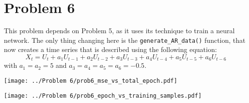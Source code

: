 \section{Problem 6}

This problem depends on Problem 5, as it uses its technique to train a neural network.
The only thing changing here is the \verb|generate_AR_data()| function, that now creates a time series that is described using the following equation:
\[
X_t = U_t + a_1 U_{t-1} + a_2 U_{t-2} + a_3 U_{t-3} + a_4 U_{t-4} + a_5 U_{t-5} + a_6 U_{t-6}
\]
with $a_1 = a_2 = 5$ and $a_3 = a_4 = a_5 = a_6 = -0.5$.

\begin{minipage}{0.48\linewidth}
	\centering
	\texttt{[image: ../Problem 6/prob6\_mse\_vs\_total\_epoch.pdf]}
	\label{fig:prob6_mse_total_epoch}
\end{minipage} \hfill
\begin{minipage}{0.48\linewidth}
	\centering
	\texttt{[image: ../Problem 6/prob6\_epoch\_vs\_training\_samples.pdf]}
	\label{fig:prob6_epoch_train_samples}
\end{minipage}
